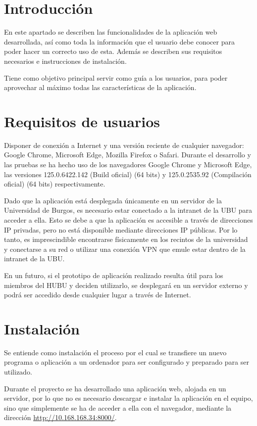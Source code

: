 
\section{Introducción}
En este apartado se describen las funcionalidades de la aplicación web desarrollada, así como toda la información que el usuario debe conocer para poder hacer un correcto uso de esta. Además se describen sus requisitos necesarios e instrucciones de instalación.

Tiene como objetivo principal servir como guía a los usuarios, para poder aprovechar al máximo todas las características de la aplicación.


\section{Requisitos de usuarios}
Disponer de conexión a Internet y una versión reciente de cualquier navegador: Google Chrome, Microsoft Edge, Mozilla Firefox o Safari. Durante el desarrollo y las pruebas se ha hecho uso de los navegadores Google Chrome y Microsoft Edge, las versiones 125.0.6422.142 (Build oficial) (64 bits) y 125.0.2535.92 (Compilación oficial) (64 bits) respectivamente.

Dado que la aplicación está desplegada únicamente en un servidor de la Universidad de Burgos, es necesario estar conectado a la intranet de la UBU para acceder a ella. Esto se debe a que la aplicación es accesible a través de direcciones IP privadas, pero no está disponible mediante direcciones IP públicas. Por lo tanto, es imprescindible encontrarse físicamente en los recintos de la universidad y conectarse a su red o utilizar una conexión VPN que emule estar dentro de la intranet de la UBU.

En un futuro, si el prototipo de aplicación realizado resulta útil para los miembros del HUBU y deciden utilizarlo, se desplegará en un servidor externo y podrá ser accedido desde cualquier lugar a través de Internet.


\section{Instalación}
Se entiende como instalación el proceso por el cual se transfiere un nuevo programa o aplicación a un ordenador para ser configurado y preparado para ser utilizado.

Durante el proyecto se ha desarrollado una aplicación web, alojada en un servidor, por lo que no es necesario descargar e instalar la aplicación en el equipo, sino que simplemente se ha de acceder a ella con el navegador, mediante la dirección \url{http://10.168.168.34:8000/}.




